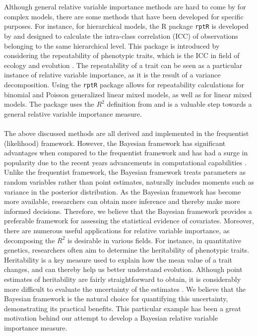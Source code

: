 \\
\\
Although general relative variable importance methods are hard to come by for complex models, there are some methods that have been developed for specific purposes. For instance, for hierarchical models, the R package \texttt{rptR} is developed by \citet{Stoffel2017rptR} and designed to calculate the intra-class correlation (ICC) of observations belonging to the same hierarchical level. This package is introduced by considering the repeatability of phenotypic traits, which is the ICC in field of ecology and evolution \citep{Stoffel2017rptR}. The repeatability of a trait can be seen as a particular instance of relative variable importance, as it is the result of a variance decomposition. Using the \texttt{rptR} package allows for repeatability calculations for binomial and Poisson generalized linear mixed models, as well as for linear mixed models. The package uses the $R^2$ definition from \citet{nakagawa2013general} and is a valuable step towards a general relative variable importance measure.
\\
\\
The above discussed methods are all derived and implemented in the frequentist (likelihood) framework. However, the Bayesian framework has significant advantages when compared to the frequentist framework \citep{robert2007bayesian} and has had a surge in popularity due to the recent years advancements in computational capabilities \citep{hackenberger2019bayes}. Unlike the frequentist framework, the Bayesian framework treats parameters as random variables rather than point estimates, naturally includes moments such as variance in the posterior distribution. As the Bayesian framework has become more available, researchers can obtain more inference and thereby make more informed decisions. Therefore, we believe that the Bayesian framework provides a preferable framework for assessing the statistical evidence of covariates. Moreover, there are numerous useful applications for relative variable importance, as decomposing the $R^2$ is desirable in various fields. For instance, in quantitative genetics, researchers often aim to determine the heritability of phenotypic traits. Heritability is a key measure used to explain how the mean value of a trait changes, and can thereby help us better understand evolution. Although point estimates of heritability are fairly straightforward to obtain, it is considerably more difficult to evaluate the uncertainty of the estimates \citep{Stoffel2017rptR}. We believe that the Bayesian framework is the natural choice for quantifying this uncertainty, demonstrating its practical benefits. This particular example has been a great motivation behind our attempt to develop a Bayesian relative variable importance measure.
